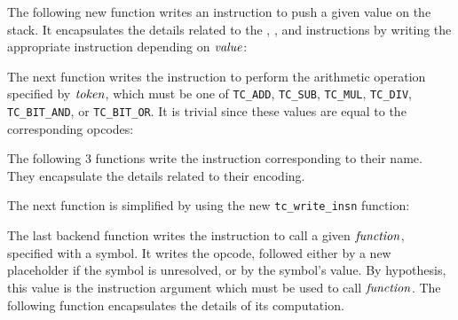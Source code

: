 The following new function writes an instruction to push a given value on the
stack. It encapsulates the details related to the , ,
 and  instructions by writing the appropriate instruction
depending on $\it{value}$:


The next function writes the instruction to perform the arithmetic operation
specified by $\it{token}$, which must be one of {\tt TC\_ADD}, {\tt TC\_SUB},
{\tt TC\_MUL}, {\tt TC\_DIV}, {\tt TC\_BIT\_AND}, or {\tt TC\_BIT\_OR}. It is
trivial since these values are equal to the corresponding opcodes:


The following 3 functions write the instruction corresponding to their name.
They encapsulate the details related to their encoding.


The next function is simplified by using the new {\tt tc\_write\_insn} function:


The last backend function writes the instruction to call a given
$\it{function}$, specified with a symbol. It writes the  opcode,
followed either by a new placeholder if the symbol is unresolved, or by the
symbol's value. By hypothesis, this value is the  instruction
argument which must be used to call $\it{function}$. The following function
encapsulates the details of its computation.


